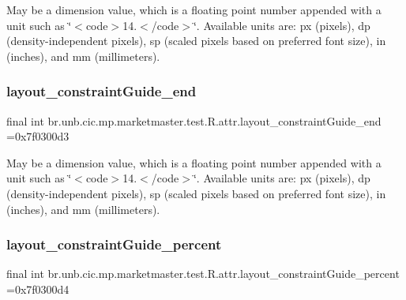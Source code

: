 May be a dimension value, which is a floating point number appended with a unit such as \char`\"{}$<$code$>$14.\+5sp$<$/code$>$\char`\"{}. Available units are\+: px (pixels), dp (density-\/independent pixels), sp (scaled pixels based on preferred font size), in (inches), and mm (millimeters). \mbox{\label{classbr_1_1unb_1_1cic_1_1mp_1_1marketmaster_1_1test_1_1R_1_1attr_a721cd6f47de1b5101db015a9145b38e4}} 
\subsubsection{\texorpdfstring{layout\+\_\+constraint\+Guide\+\_\+end}{layout\_constraintGuide\_end}}
{\footnotesize\ttfamily final int br.\+unb.\+cic.\+mp.\+marketmaster.\+test.\+R.\+attr.\+layout\+\_\+constraint\+Guide\+\_\+end =0x7f0300d3\hspace{0.3cm}{\ttfamily [static]}}

May be a dimension value, which is a floating point number appended with a unit such as \char`\"{}$<$code$>$14.\+5sp$<$/code$>$\char`\"{}. Available units are\+: px (pixels), dp (density-\/independent pixels), sp (scaled pixels based on preferred font size), in (inches), and mm (millimeters). \mbox{\label{classbr_1_1unb_1_1cic_1_1mp_1_1marketmaster_1_1test_1_1R_1_1attr_ad51fc4f46f5ea99b8e9b3c46e7b1f182}} 
\subsubsection{\texorpdfstring{layout\+\_\+constraint\+Guide\+\_\+percent}{layout\_constraintGuide\_percent}}
{\footnotesize\ttfamily final int br.\+unb.\+cic.\+mp.\+marketmaster.\+test.\+R.\+attr.\+layout\+\_\+constraint\+Guide\+\_\+percent =0x7f0300d4\hspace{0.3cm}{\ttfamily [static]}}

